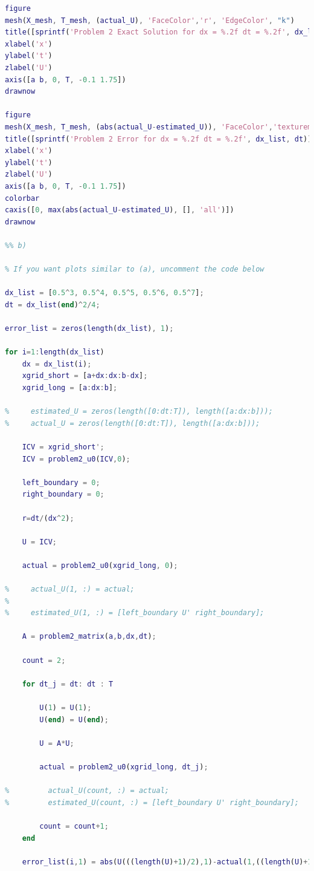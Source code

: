 \documentclass[12pt,letterpaper]{article}
\begin{document}
\begin{lstlisting}[language = Matlab]
figure
mesh(X_mesh, T_mesh, (actual_U), 'FaceColor','r', 'EdgeColor', "k")
title([sprintf('Problem 2 Exact Solution for dx = %.2f dt = %.2f', dx_list, dt)])
xlabel('x')
ylabel('t')
zlabel('U')
axis([a b, 0, T, -0.1 1.75])
drawnow

figure
mesh(X_mesh, T_mesh, (abs(actual_U-estimated_U)), 'FaceColor','texturemap', 'EdgeColor', "k")
title([sprintf('Problem 2 Error for dx = %.2f dt = %.2f', dx_list, dt)])
xlabel('x')
ylabel('t')
zlabel('U')
axis([a b, 0, T, -0.1 1.75])
colorbar
caxis([0, max(abs(actual_U-estimated_U), [], 'all')])
drawnow

%% b)

% If you want plots similar to (a), uncomment the code below

dx_list = [0.5^3, 0.5^4, 0.5^5, 0.5^6, 0.5^7];
dt = dx_list(end)^2/4;

error_list = zeros(length(dx_list), 1);

for i=1:length(dx_list)
    dx = dx_list(i);
    xgrid_short = [a+dx:dx:b-dx];
    xgrid_long = [a:dx:b];

%     estimated_U = zeros(length([0:dt:T]), length([a:dx:b]));
%     actual_U = zeros(length([0:dt:T]), length([a:dx:b]));
    
    ICV = xgrid_short';
    ICV = problem2_u0(ICV,0);

    left_boundary = 0;
    right_boundary = 0;

    r=dt/(dx^2);

    U = ICV;

    actual = problem2_u0(xgrid_long, 0);

%     actual_U(1, :) = actual;
% 
%     estimated_U(1, :) = [left_boundary U' right_boundary];

    A = problem2_matrix(a,b,dx,dt);

    count = 2;

    for dt_j = dt: dt : T

        U(1) = U(1);
        U(end) = U(end);

        U = A*U;

        actual = problem2_u0(xgrid_long, dt_j);

%         actual_U(count, :) = actual;
%         estimated_U(count, :) = [left_boundary U' right_boundary];

        count = count+1;
    end

    error_list(i,1) = abs(U(((length(U)+1)/2),1)-actual(1,((length(U)+1)/2)));




\end{lstlisting}
\end{document}
